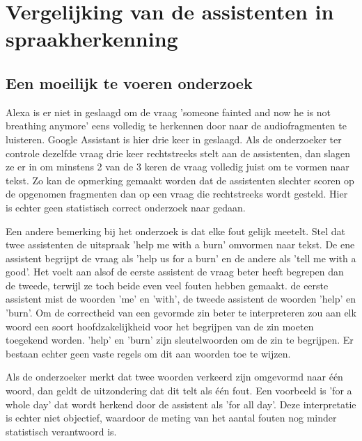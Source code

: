 \section{Vergelijking van de assistenten in spraakherkenning}
\subsection{Een moeilijk te voeren onderzoek}
Alexa is er niet in geslaagd om de vraag 'someone fainted and now he is not breathing anymore' eens volledig te herkennen door naar de audiofragmenten te luisteren. Google Assistant is hier drie keer in geslaagd. Als de onderzoeker ter controle dezelfde vraag drie keer rechtstreeks stelt aan de assistenten, dan slagen ze er in om minstens 2 van de 3 keren de vraag volledig juist om te vormen naar tekst. Zo kan de opmerking gemaakt worden dat de assistenten slechter scoren op de opgenomen fragmenten dan op een vraag die rechtstreeks wordt gesteld. Hier is echter geen statistisch correct onderzoek naar gedaan.

Een andere bemerking bij het onderzoek is dat elke fout gelijk meetelt. Stel dat twee assistenten de uitspraak 'help me with a burn' omvormen naar tekst. De ene assistent begrijpt de vraag als 'help us for a burn' en de andere als 'tell me with a good'. Het voelt aan alsof de eerste assistent de vraag beter heeft begrepen dan de tweede, terwijl ze toch beide even veel fouten hebben gemaakt. de eerste assistent mist de woorden 'me' en 'with', de tweede assistent de woorden 'help' en 'burn'. Om de correctheid van een gevormde zin beter te interpreteren zou aan elk woord een soort hoofdzakelijkheid voor het begrijpen van de zin moeten toegekend worden. 'help' en 'burn' zijn sleutelwoorden om de zin te begrijpen. Er bestaan echter geen vaste regels om dit aan woorden toe te wijzen.

Als de onderzoeker merkt dat twee woorden verkeerd zijn omgevormd naar één woord, dan geldt de uitzondering dat dit telt als één fout. Een voorbeeld is 'for a whole day' dat wordt herkend door de assistent als 'for all day'. Deze interpretatie is echter niet objectief, waardoor de meting van het aantal fouten nog minder statistisch verantwoord is.

